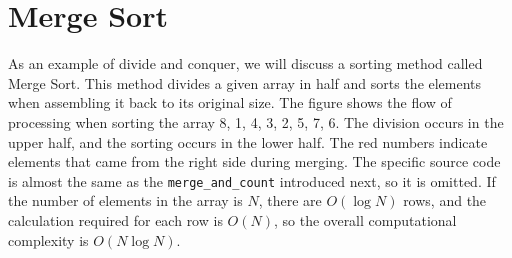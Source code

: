 \section{Merge Sort}
As an example of divide and conquer, we will discuss a sorting method called Merge Sort. This method divides a given array in half and sorts the elements when assembling it back to its original size. The figure shows the flow of processing when sorting the array 8, 1, 4, 3, 2, 5, 7, 6. The division occurs in the upper half, and the sorting occurs in the lower half. The red numbers indicate elements that came from the right side during merging.
The specific source code is almost the same as the \texttt{merge\_and\_count} introduced next, so it is omitted. If the number of elements in the array is $N$, there are $O(\log N)$ rows, and the calculation required for each row is $O(N)$, so the overall computational complexity is $O(N\log N)$.

